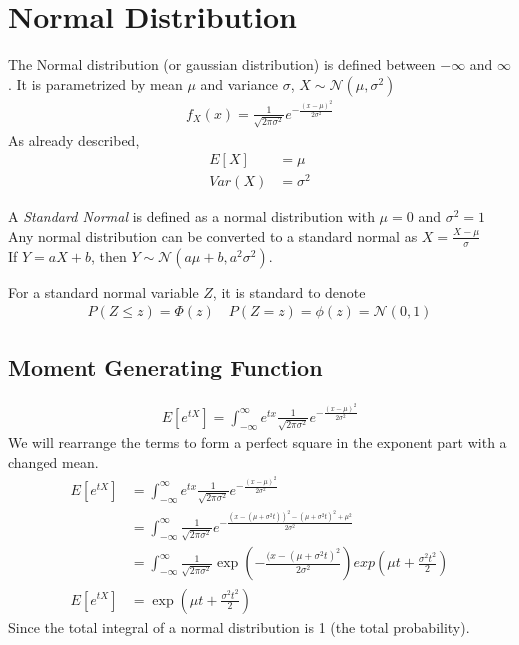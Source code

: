 \documentclass[../../probability-notes.tex]{subfiles}
\begin{document}
    \section{Normal Distribution}
    The Normal distribution (or gaussian distribution) is defined between $-\infty$ and $\infty$. It is parametrized by mean $\mu$ and variance $\sigma$, $X \sim \mathcal{N}(\mu, \sigma^{2})$
    \begin{align*}
        f_{X}(x) = \frac{1}{\sqrt{2\pi \sigma^{2}}} e^{-\frac{(x-\mu)^{2}}{2 \sigma^{2}}}
    \end{align*}
    As already described,
    \begin{align*}
        E[X] &= \mu\\
        Var(X) &= \sigma^{2}
    \end{align*}

    A \emph{Standard Normal} is defined as a normal distribution with $\mu = 0$ and $\sigma^{2} = 1$\\
    Any normal distribution can be converted to a standard normal as $X = \frac{X - \mu}{\sigma}$\\
    If $Y = aX + b$, then $Y \sim \mathcal{N}(a \mu + b, a^{2}\sigma^{2})$.\newline

    For a standard normal variable $Z$, it is standard to denote
    \begin{align*}
        P(Z \leq z) = \Phi(z) \quad P(Z = z) = \phi(z) = \mathcal{N}(0,1)
    \end{align*}

    \subsection{Moment Generating Function}
    \begin{align*}
        E[e^{tX}] = \int_{-\infty}^{\infty} e^{tx} \frac{1}{\sqrt{2\pi \sigma^{2}}} e^{-\frac{(x-\mu)^{2}}{2 \sigma^{2}}}
    \end{align*}
    We will rearrange the terms to form a perfect square in the exponent part with a changed mean.
    \begin{align*}
        E[e^{tX}] &= \int_{-\infty}^{\infty} e^{tx} \frac{1}{\sqrt{2\pi \sigma^{2}}} e^{-\frac{(x-\mu)^{2}}{2 \sigma^{2}}}\\
        &= \int_{-\infty}^{\infty}\frac{1}{\sqrt{2\pi \sigma^{2}}}e^{-\frac{(x-(\mu+\sigma^{2}t))^{2} - (\mu+\sigma^{2}t)^{2} + \mu^{2}}{2 \sigma^{2}}}\\
        &= \int_{-\infty}^{\infty}\frac{1}{\sqrt{2\pi \sigma^{2}}} \exp(-\frac{(x-(\mu+\sigma^{2}t)^{2}}{2 \sigma^{2}}) exp(\mu t + \frac{\sigma^{2} t^{2}}{2})\\
        E[e^{tX}] &= \exp(\mu t + \frac{\sigma^{2} t^{2}}{2})
    \end{align*}
    Since the total integral of a normal distribution is 1 (the total probability).
\end{document}
